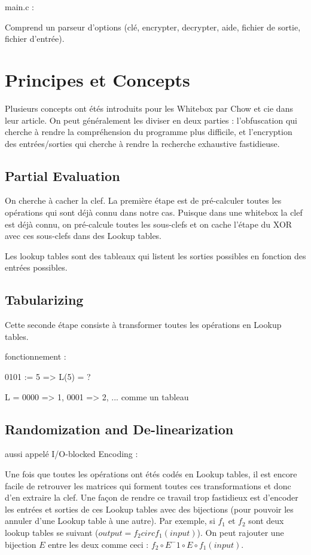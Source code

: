 \documentclass[a4paper,12pt]{article}
\begin{document}
main.c :

	Comprend un parseur d'options (clé, encrypter, decrypter, aide, fichier de sortie, fichier d'entrée).


\newpage

\section{Principes et Concepts}

Plusieurs concepts ont étés introduits pour les Whitebox par Chow et cie dans leur article. On peut généralement les diviser en deux parties : l'obfuscation qui cherche à rendre la compréhension du programme plus difficile, et
 l'encryption des entrées/sorties qui cherche à rendre la recherche exhaustive fastidieuse.

\subsection{Partial Evaluation}

On cherche à cacher la clef. La première étape est de pré-calculer toutes les opérations qui sont déjà connu dans notre cas. Puisque dans une whitebox la clef est déjà connu, on pré-calcule toutes les sous-clefs et on cache l'étape du XOR avec ces sous-clefs dans des Lookup tables.

Les lookup tables sont des tableaux qui listent les sorties possibles en fonction des entrées possibles.

\subsection{Tabularizing}

Cette seconde étape consiste à transformer toutes les opérations en Lookup tables.

fonctionnement :

0101 := 5 => L(5) = ?

L = { 0000 => 1, 0001 => 2, ... } comme un tableau

\subsection{Randomization and De-linearization}

aussi appelé I/O-blocked Encoding :

Une fois que toutes les opérations ont étés codés en Lookup tables, il est encore facile de retrouver les matrices qui forment toutes ces transformations et donc d'en extraire la clef. Une façon de rendre ce travail trop fastidieux est d'encoder les entrées et sorties de ces Lookup tables avec des bijections (pour pouvoir les annuler d'une Lookup table à une autre).
Par exemple, si $f_1$ et $f_2$ sont deux lookup tables se suivant ($output = f_2 circ f_1(input)$). On peut rajouter une bijection $E$ entre les deux comme ceci : $f_2 \circ E^-1 \circ E \circ f_1(input)$.
\end{document}
